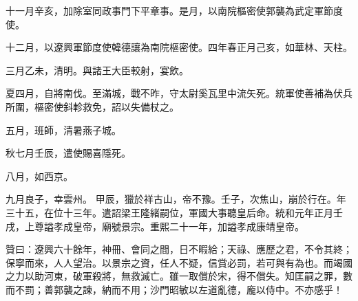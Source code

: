 \begin{pinyinscope}
 十一月辛亥，加除室同政事門下平章事。是月，以南院樞密使郭襲為武定軍節度使。



 十二月，以遼興軍節度使韓德讓為南院樞密使。四年春正月己亥，如華林、天柱。



 三月乙未，清明。與諸王大臣較射，宴飲。



 夏四月，自將南伐。至滿城，戰不昨，守太尉奚瓦里中流矢死。統軍使善補為伏兵所圍，樞密使斜軫救免，詔以失備杖之。



 五月，班師，清暑燕子城。



 秋七月壬辰，遣使賜喜隱死。



 八月，如西京。



 九月良子，幸雲州。
 甲辰，獵於祥古山，帝不豫。壬子，次焦山，崩於行在。年三十五，在位十三年。遣詔梁王隆緒嗣位，軍國大事聽皇后命。統和元年正月壬戌，上尊謚孝成皇帝，廟號景宗。重熙二十一年，加謚孝成康靖皇帝。



 贊曰：遼興六十餘年，神冊、會同之間，日不暇給；天祿、應歷之君，不令其終；保寧而來，人人望治。以景宗之資，任人不疑，信賞必罰，若可與有為也。而竭國之力以助河東，破軍殺將，無救滅亡。雖一取償於宋，得不償失。知匡嗣之罪，數而不罰；善郭襲之諫，納而不用；沙門昭敏以左道亂德，龐以侍中。不亦感乎！



\end{pinyinscope}